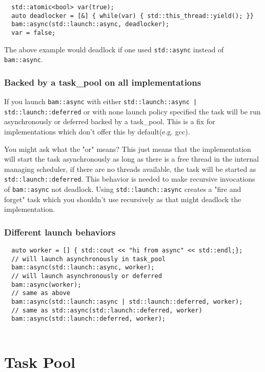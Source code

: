 \documentclass[11pt, a4paper]{article}
\begin{document}
\begin{lstlisting}
  std::atomic<bool> var(true);
  auto deadlocker = [&] { while(var) { std::this_thread::yield(); }}
  bam::async(std::launch::async, deadlocker);
  var = false;
\end{lstlisting}

The above example would deadlock if one used \texttt{std::async} instead of \texttt{bam::async}. 

\subsubsection{ Backed by a task\_pool on all implementations}

If you launch \texttt{bam::async} with either \texttt{std::launch::async | std::launch::deferred} or with none launch policy specified the task will be run asynchronously or deferred backed by a task\_pool. This is a fix for implementations which don't offer this by default(e.g. gcc). 

You might ask what the "or" means? This just means that the implementation will start the task asynchronously as long as there is a free thread in the internal managing scheduler, if there are no threads available, the task will be started as \texttt{std::launch::deferred}. This behavior is needed to make recursive invocations of \texttt{bam::async} not deadlock. Using \texttt{std::launch::async} creates a "fire and forget" task which you shouldn't use recursively as that might deadlock the implementation.

\subsubsection{ Different launch behaviors} 

\begin{lstlisting}
  auto worker = [] { std::cout << "hi from async" << std::endl;};
  // will launch asynchronously in task_pool
  bam::async(std::launch::async, worker); 
  // will launch asynchronously or deferred
  bam::async(worker);
  // same as above
  bam::async(std::launch::async | std::launch::deferred, worker);
  // same as std::async(std::launch::deferred, worker)
  bam::async(std::launch::deferred, worker); 


\end{lstlisting}

\section{Task Pool}
\end{document}
